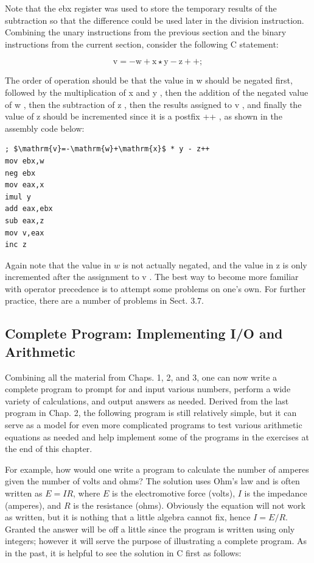 \documentclass[10pt]{article}
\begin{document}
Note that the ebx register was used to store the temporary results of the subtraction so that the difference could be used later in the division instruction. Combining the unary instructions from the previous section and the binary instructions from the current section, consider the following C statement:

$$
\mathrm{v}=-\mathrm{w}+\mathrm{x} \star \mathrm{y}-\mathrm{z}++;
$$

The order of operation should be that the value in w should be negated first, followed by the multiplication of x and y , then the addition of the negated value of w , then the subtraction of z , then the results assigned to v , and finally the value of z should be incremented since it is a postfix ++ , as shown in the assembly code below:

\begin{verbatim}
; $\mathrm{v}=-\mathrm{w}+\mathrm{x}$ * y - z++
mov ebx,w
neg ebx
mov eax,x
imul y
add eax,ebx
sub eax,z
mov v,eax
inc z
\end{verbatim}

Again note that the value in $w$ is not actually negated, and the value in z is only incremented after the assignment to v . The best way to become more familiar with operator precedence is to attempt some problems on one's own. For further practice, there are a number of problems in Sect. 3.7.

\subsection*{Complete Program: Implementing I/O and Arithmetic}
Combining all the material from Chaps. 1, 2, and 3, one can now write a complete program to prompt for and input various numbers, perform a wide variety of calculations, and output answers as needed. Derived from the last program in Chap. 2, the following program is still relatively simple, but it can serve as a model for even more complicated programs to test various arithmetic equations as needed and help implement some of the programs in the exercises at the end of this chapter.

For example, how would one write a program to calculate the number of amperes given the number of volts and ohms? The solution uses Ohm's law and is often written as $E=I R$, where $E$ is the electromotive force (volts), $I$ is the impedance (amperes), and $R$ is the resistance (ohms). Obviously the equation will not work as written, but it is nothing that a little algebra cannot fix, hence $I=E / R$. Granted the answer will be off a little since the program is written using only integers; however it will serve the purpose of illustrating a complete program. As in the past, it is helpful to see the solution in C first as follows:
\end{document}
